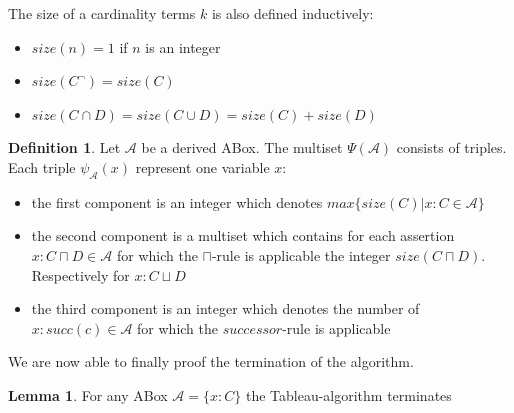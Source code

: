 \documentclass{book}
\theoremstyle{break}
\theoremstyle{definition}
\newtheorem{mydef}{Definition}
\newtheorem{mylem}{Lemma}
\begin{document}
The size of a cardinality terms $k$ is also defined inductively:
\begin{itemize}
\item $size(n)=1$ if $n$ is an integer
\item $size(C^\neg)=size(C)$
\item $size(C\cap D)=size(C\cup D)= size(C)+ size(D)$
\end{itemize}
\begin{mydef}
Let $\mathcal{A}$ be a derived ABox. The multiset $\Psi(\mathcal{A})$ consists of triples. Each triple $\psi_\mathcal{A}(x)$ represent one variable $x$:
\begin{itemize}
\item the first component is an integer which denotes $max\{size(C)|x:C\in\mathcal{A}\}$
\item the second component is a multiset which contains for each assertion $x:C\sqcap D\in\mathcal{A}$ for which the $\sqcap$-rule is applicable the integer $size(C\sqcap D)$. Respectively for $x:C\sqcup D$
\item the third component is an integer which denotes the number of $x:succ(c)\in\mathcal{A}$ for which the $successor$-rule is applicable
\end{itemize}
\end{mydef}
We are now able to finally proof the termination of the algorithm.
\begin{mylem}
For any ABox $\mathcal{A}=\{x:C\}$ the Tableau-algorithm terminates
\end{mylem}
\end{document}
